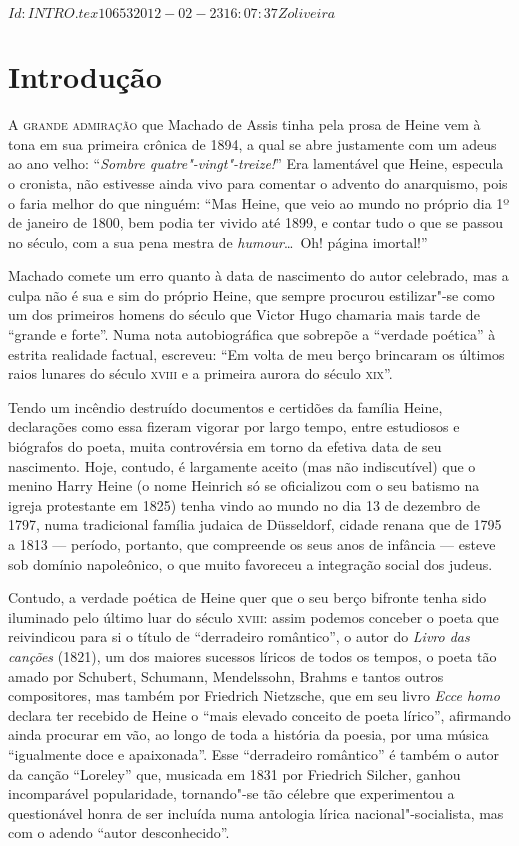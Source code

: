 \SVN $Id: INTRO.tex 10653 2012-02-23 16:07:37Z oliveira $


\chapter[Introdução, por Marcus Mazzari]{Introdução}

\textsc{A grande admiração} que Machado de Assis tinha pela prosa de Heine vem à
tona em sua primeira crônica de 1894, a qual se abre justamente com um
adeus ao ano velho: “\textit{Sombre quatre"-vingt"-treize!}” Era
lamentável que Heine, especula o cronista, não estivesse ainda vivo
para comentar o advento do anarquismo, pois o faria melhor do que
ninguém: “Mas Heine, que veio ao mundo no próprio dia 1º de janeiro de
1800, bem podia ter vivido até 1899, e contar tudo o que se passou no
século, com a sua pena mestra de \textit{humour}\ldots\ Oh! página
imortal!”

Machado comete um erro quanto à data de nascimento do autor celebrado,
mas a culpa não é sua e sim do próprio Heine, que sempre procurou
estilizar"-se como um dos primeiros homens do século que Victor Hugo
chamaria mais tarde  de “grande e forte”. Numa nota autobiográfica que
sobrepõe a “verdade poética” à estrita realidade factual, escreveu: “Em
volta de meu berço brincaram os últimos raios lunares do século \textsc{xviii} e
a primeira aurora do século \textsc{xix}”.

Tendo um incêndio destruído documentos e certidões da família Heine,
declarações como essa fizeram vigorar por largo tempo, entre estudiosos
e biógrafos do poeta, muita controvérsia em torno da efetiva data de
seu nascimento. Hoje, contudo, é largamente aceito (mas não
indiscutível) que o menino Harry Heine (o nome Heinrich só se
oficializou com o seu batismo na igreja protestante em 1825) tenha
vindo ao mundo no dia 13 de dezembro de 1797, numa tradicional família
judaica de Düsseldorf, cidade renana que de 1795 a 1813 --- período,
portanto, que compreende os seus anos de infância --- esteve sob domínio
napoleônico, o que muito favoreceu a integração social dos judeus.

Contudo, a verdade poética de Heine quer que o seu berço bifronte tenha
sido iluminado pelo último luar do século \textsc{xviii}: assim podemos conceber
o poeta que reivindicou para si o título de “derradeiro romântico”, o
autor do \textit{Livro das canções} (1821), um dos maiores sucessos
líricos de todos os tempos, o poeta tão amado por Schubert, Schumann,
Mendelssohn, Brahms e tantos outros compositores, mas também por
Friedrich Nietzsche, que em seu livro \textit{Ecce homo} declara ter
recebido de Heine o “mais elevado conceito de poeta lírico”, afirmando
ainda procurar em vão, ao longo de toda a história da poesia, por uma
música “igualmente doce e apaixonada”. Esse “derradeiro romântico” é
também o autor da canção “Loreley” que, musicada em 1831 por Friedrich
Silcher, ganhou incomparável popularidade, tornando"-se tão célebre
que experimentou a questionável honra de ser incluída numa antologia
lírica nacional"-socialista, mas com o adendo “autor desconhecido”.

